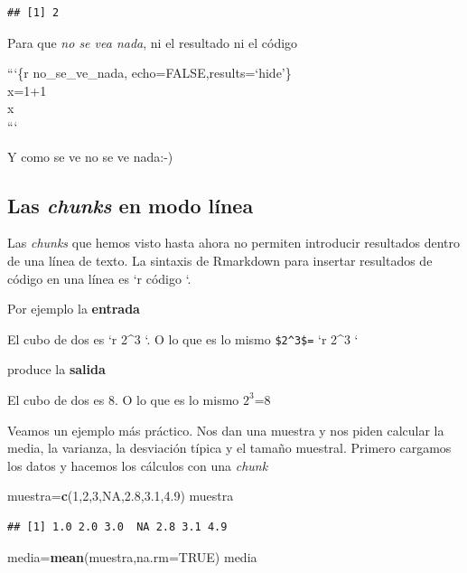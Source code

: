 \documentclass[]{article}
\newenvironment{Shaded}{\begin{snugshade}}{\end{snugshade}}
\newcommand{\KeywordTok}[1]{\textcolor[rgb]{0.13,0.29,0.53}{\textbf{{#1}}}}
\newcommand{\DataTypeTok}[1]{\textcolor[rgb]{0.13,0.29,0.53}{{#1}}}
\newcommand{\DecValTok}[1]{\textcolor[rgb]{0.00,0.00,0.81}{{#1}}}
\newcommand{\FloatTok}[1]{\textcolor[rgb]{0.00,0.00,0.81}{{#1}}}
\newcommand{\OtherTok}[1]{\textcolor[rgb]{0.56,0.35,0.01}{{#1}}}
\newcommand{\NormalTok}[1]{{#1}}
\begin{document}
\begin{verbatim}
## [1] 2
\end{verbatim}

Para que \emph{no se vea nada}, ni el resultado ni el código

```\{r no\_se\_ve\_nada, echo=FALSE,results=`hide'\}\\x=1+1\\x\\```

Y como se ve no se ve nada:-)

\subsection{Las \emph{chunks} en modo línea
}\label{las-chunks-en-modo-linea}

Las \emph{chunks} que hemos visto hasta ahora no permiten introducir
resultados dentro de una línea de texto. La sintaxis de Rmarkdown para
insertar resultados de código en una línea es `r código `.

Por ejemplo la \textbf{entrada}

El cubo de dos es `r 2\^{}3 `. O lo que es lo mismo \texttt{\$2\^{}3\$=}
`r 2\^{}3 `

produce la \textbf{salida}

El cubo de dos es 8. O lo que es lo mismo $2^3$=8

Veamos un ejemplo más práctico. Nos dan una muestra y nos piden calcular
la media, la varianza, la desviación típica y el tamaño muestral.
Primero cargamos los datos y hacemos los cálculos con una \emph{chunk}

\begin{Shaded}
\begin{Highlighting}[]
\NormalTok{muestra=}\KeywordTok{c}\NormalTok{(}\DecValTok{1}\NormalTok{,}\DecValTok{2}\NormalTok{,}\DecValTok{3}\NormalTok{,}\OtherTok{NA}\NormalTok{,}\FloatTok{2.8}\NormalTok{,}\FloatTok{3.1}\NormalTok{,}\FloatTok{4.9}\NormalTok{)}
\NormalTok{muestra}
\end{Highlighting}
\end{Shaded}

\begin{verbatim}
## [1] 1.0 2.0 3.0  NA 2.8 3.1 4.9
\end{verbatim}

\begin{Shaded}
\begin{Highlighting}[]
\NormalTok{media=}\KeywordTok{mean}\NormalTok{(muestra,}\DataTypeTok{na.rm=}\OtherTok{TRUE}\NormalTok{)}
\NormalTok{media}
\end{Highlighting}
\end{Shaded}
\end{document}
